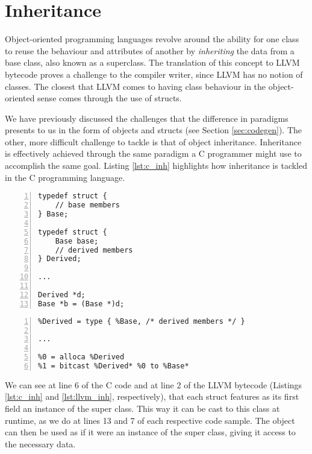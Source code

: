 \newpage

\section{Inheritance}
\label{sec:inheritance}

Object-oriented programming languages revolve around the ability for one class to reuse the behaviour and attributes of another by \textit{inheriting} the data from a base class, also known as a superclass. The translation of this concept to LLVM bytecode proves a challenge to the compiler writer, since LLVM has no notion of classes. The closest that LLVM comes to having class behaviour  in the object-oriented sense comes through the use of structs.

We have previously discussed the challenges that the difference in paradigms presents to us in the form of objects and structs (see Section \ref{sec:codegen}). The other, more difficult challenge to tackle is that of object inheritance. Inheritance is effectively achieved through the same paradigm a C programmer might use to accomplish the same goal. Listing \ref{lst:c_inh} highlights how inheritance is tackled in the C programming language.

\newpage

\lstset{
	language=C,
	basicstyle=\small,
	stringstyle=\ttfamily
}

\begin{lstlisting}[frame=single, numbers=left, numberstyle=\tiny, caption={C Inheritance}, label=lst:c_inh]
typedef struct {
    // base members
} Base;

typedef struct {
    Base base;  
    // derived members   
} Derived;

...

Derived *d;
Base *b = (Base *)d;
\end{lstlisting}


\begin{lstlisting}[frame=single, numbers=left, numberstyle=\tiny, caption={LLVM IR Inheritance}, label=lst:llvm_inh]
%Base = type { /* base members */ }
%Derived = type { %Base, /* derived members */ }

...

%0 = alloca %Derived
%1 = bitcast %Derived* %0 to %Base*
\end{lstlisting}

We can see at line 6 of the C code and at line 2 of the LLVM bytecode (Listings \ref{lst:c_inh} and \ref{lst:llvm_inh}, respectively), that each struct features as its first field an instance of the super class. This way it can be cast to this class at runtime, as we do at lines 13 and 7 of each respective code sample. The object can then be used as if it were an instance of the super class, giving it access to the necessary data.

